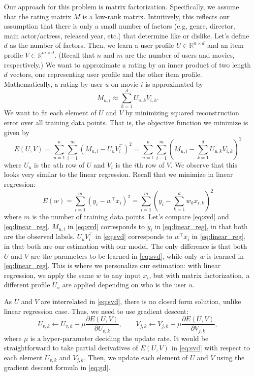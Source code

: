 \documentclass[12pt]{article}
\begin{document}
Our approach for this problem is matrix factorization. Specifically,
we assume that the rating matrix $M$ is a low-rank matrix.
Intuitively, this reflects our assumption that there is only a small
number of factors (e.g, genre, director, main actor/actress,
released year, etc.) that determine like or dislike. Let's define
$d$ as the number of factors. Then, we learn a user profile $U \in
\mathbb{R}^{n \times d}$ and an item profile $V \in \mathbb{R}^{m
\times d}$. (Recall that $n$ and $m$ are the number of users and
movies, respectively.) We want to approximate a rating by an inner
product of two length $d$ vectors, one representing user profile and
the other item profile. Mathematically, a rating by user $u$ on
movie $i$ is approximated by
\begin{equation}
M_{u,i} \approx \sum_{k=1}^d U_{u,k} V_{i,k}.
\end{equation}
We want to fit each element of $U$ and $V$ by minimizing squared
reconstruction error over all training data points. That is, the
objective function we minimize is given by
\begin{equation}
E(U,V) = \sum_{u=1}^n\sum_{i=1}^m (M_{u,i} - U_u V_i^\top)^2 = \sum_{u =1}^n\sum_{i=1}^m  (M_{u,i} - \sum_{k=1}^d U_{u,k} V_{i,k})^2 \label{eq:svd}
\end{equation}
where $U_u$ is the $u$th row of $U$ and $V_i$ is the $i$th row of
$V$. We observe that this looks very similar to the linear
regression. Recall that we minimize in linear regression:
\begin{equation}
E(w) = \sum_{i=1}^m (y_i - w^\top x_i)^2 = \sum_{i=1}^m (y_i
- \sum_{k=1}^d w_k x_{i,k})^2 \label{eq:linear_reg}
\end{equation}
where $m$ is the number of training data points. Let's compare
\eqref{eq:svd} and \eqref{eq:linear_reg}. $M_{u,i}$ in
\eqref{eq:svd} corresponds to $y_i$ in \eqref{eq:linear_reg}, in
that both are the observed labels. $U_u V_i^\top$ in \eqref{eq:svd}
corresponds to $w^\top x_i$ in \eqref{eq:linear_reg}, in that both
are our estimation with our model. The only difference is that both
$U$ and $V$ are the parameters to be learned in \eqref{eq:svd},
while only $w$ is learned in \eqref{eq:linear_reg}. This is
where we personalize our estimation: with linear regression, we
apply the same $w$ to any input $x_i$, but with matrix
factorization, a different profile $U_u$ are applied depending on
who is the user $u$.

As $U$ and $V$ are interrelated in \eqref{eq:svd}, there is no
closed form solution, unlike linear regression case. Thus, we need
to use gradient descent:
\begin{equation}
U_{v,k} \gets U_{v,k} - \mu \frac{\partial E(U, V)}{\partial
U_{v,k}}, \quad \quad V_{j,k} \gets V_{j,k} - \mu \frac{\partial
E(U, V)}{\partial V_{j,k}},\label{eq:gd}
\end{equation}
where $\mu$ is a hyper-parameter deciding the update rate. It would
be straightforward to take partial derivatives of $E(U,V)$ in
\eqref{eq:svd} with respect to each element $U_{v,k}$ and $V_{j,k}$.
Then, we update each element of $U$ and $V$ using the gradient
descent formula in \eqref{eq:gd}.
\end{document}
